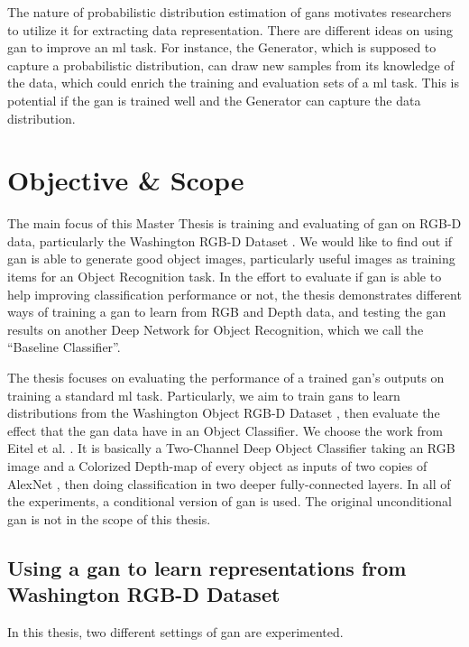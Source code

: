 The nature of probabilistic distribution estimation of \acrshort{gan}s motivates
researchers to utilize it for extracting data representation. There are different ideas on
using \acrshort{gan} to improve an \acrshort{ml} task. For instance, the Generator, which
is supposed to capture a probabilistic distribution, can draw new samples from its
knowledge of the data, which could enrich the training and evaluation sets of a
\acrshort{ml} task. This is potential if the \acrshort{gan} is trained well and the
Generator can capture the data distribution.

\section{Objective \& Scope \label{sec:objective}}
The main focus of this Master Thesis is training and evaluating of \acrfull{gan} on RGB-D
data, particularly the Washington RGB-D Dataset \cite{washington_rgbd}. We would like to
find out if \acrshort{gan} is able to generate good object images, particularly useful
images as training items for an Object Recognition task. In the effort to evaluate if
\acrshort{gan} is able to help improving classification performance
or not, the thesis demonstrates different ways of training a \acrshort{gan}
to learn from RGB and Depth data, and testing the \acrshort{gan} results on another Deep
Network for Object Recognition, which we call the ``Baseline Classifier''.

The thesis focuses on evaluating the performance of a trained \acrshort{gan}'s outputs on
training a standard \acrshort{ml} task. Particularly, we aim to train \acrshort{gan}s to
learn distributions from the Washington Object RGB-D Dataset \cite{washington_rgbd}, then
evaluate the effect that the \acrshort{gan} data have in an Object Classifier. We choose
the work from Eitel et al. \cite{eitel}. It is basically a Two-Channel Deep Object
Classifier taking an RGB image and a Colorized Depth-map of every object as inputs of two
copies of AlexNet \cite{alexnet}, then doing classification in two deeper fully-connected
layers. In all of the experiments, a conditional version of \acrshort{gan} is used. The
original unconditional \acrshort{gan} is not in the scope of this thesis.  

\subsection{Using a \acrshort{gan} to learn representations from Washington RGB-D Dataset} 
In this thesis, two different settings of \acrshort{gan} are experimented. 

